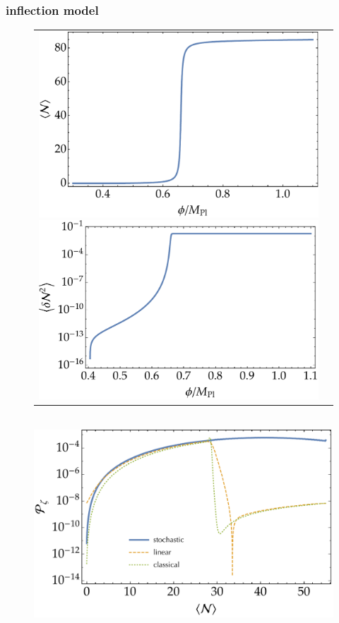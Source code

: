 \documentclass[aps, prd
, preprint
, nofootinbib 
, longbibliography
]{revtex4-1}
\begin{document}
\subsubsection{inflection model}

\begin{figure}
	\centering
	\begin{tabular}{cc}
		\begin{minipage}{0.5\hsize}
			\centering
			\includegraphics[width=0.9\hsize]{figs/inflection/N_conf.pdf}
		\end{minipage}
		\begin{minipage}{0.5\hsize}
			\centering
			\includegraphics[width=0.9\hsize]{figs/inflection/dN2_conf.pdf}
		\end{minipage}
	\end{tabular} \\[10pt]
	\includegraphics[width=0.5\hsize]{figs/inflection/Pzeta_conf.pdf}

\end{figure}
\end{document}
